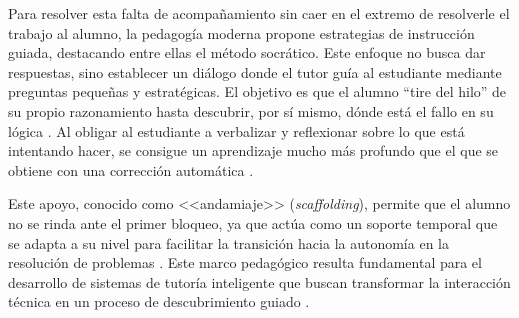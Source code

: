Para resolver esta falta de acompañamiento sin caer en el extremo de resolverle el trabajo al alumno, la pedagogía moderna propone estrategias de instrucción guiada, destacando entre ellas el método socrático. Este enfoque no busca dar respuestas, sino establecer un diálogo donde el tutor guía al estudiante mediante preguntas pequeñas y estratégicas. El objetivo es que el alumno ``tire del hilo'' de su propio razonamiento hasta descubrir, por sí mismo, dónde está el fallo en su lógica \cite{alhossami2024can}. Al obligar al estudiante a verbalizar y reflexionar sobre lo que está intentando hacer, se consigue un aprendizaje mucho más profundo que el que se obtiene con una corrección automática \cite{aleven2002effective}.

Este apoyo, conocido como <<andamiaje>> (\textit{scaffolding}), permite que el alumno no se rinda ante el primer bloqueo, ya que actúa como un soporte temporal que se adapta a su nivel para facilitar la transición hacia la autonomía en la resolución de problemas \cite{wood1976role}. Este marco pedagógico resulta fundamental para el desarrollo de sistemas de tutoría inteligente que buscan transformar la interacción técnica en un proceso de descubrimiento guiado \cite{kargupta2024instruct}.